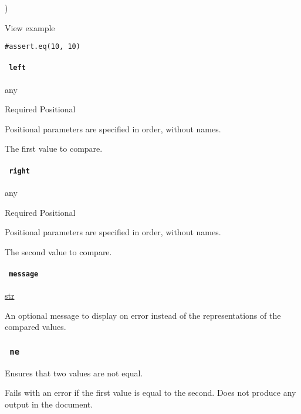 )


View example

\begin{verbatim}
#assert.eq(10, 10)
\end{verbatim}

\paragraph{\texorpdfstring{\texttt{\ left\ }}{ left }}\label{definitions-eq-left}

{ any }

{Required} {{ Positional }}

\label{definitions-eq-left-positional-tooltip}
Positional parameters are specified in order, without names.

The first value to compare.

\paragraph{\texorpdfstring{\texttt{\ right\ }}{ right }}\label{definitions-eq-right}

{ any }

{Required} {{ Positional }}

\label{definitions-eq-right-positional-tooltip}
Positional parameters are specified in order, without names.

The second value to compare.

\paragraph{\texorpdfstring{\texttt{\ message\ }}{ message }}\label{definitions-eq-message}

\href{/docs/reference/foundations/str/}{str}

An optional message to display on error instead of the representations
of the compared values.

\subsubsection{\texorpdfstring{\texttt{\ ne\ }}{ ne }}\label{definitions-ne}

Ensures that two values are not equal.

Fails with an error if the first value is equal to the second. Does not
produce any output in the document.

